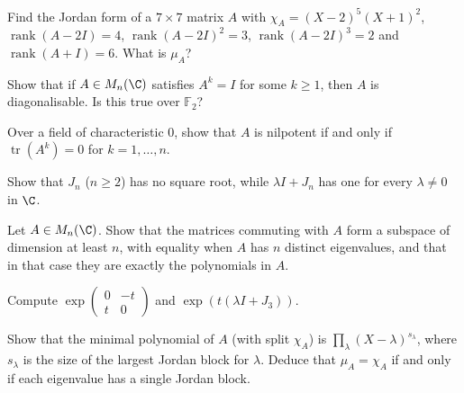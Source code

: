 \begin{exercise}[$\star\star$]\label{linear:ex:jordanfind}
Find the Jordan form of a $7\times7$ matrix $A$ with $\chi_A=(X-2)^5(X+1)^2$, $\operatorname{rank}(A-2I)=4$,
$\operatorname{rank}(A-2I)^2=3$, $\operatorname{rank}(A-2I)^3=2$ and $\operatorname{rank}(A+I)=6$. What is $\mu_A$?
\end{exercise}

\begin{exercise}[$\star\star$]\label{linear:ex:finiteorder}
Show that if $A\in M_n(\C)$ satisfies $A^k=I$ for some $k\ge1$, then $A$ is diagonalisable. Is this true over
$\mathbb F_2$?
\end{exercise}

\begin{exercise}[$\star\star$]\label{linear:ex:nilptrace}
Over a field of characteristic $0$, show that $A$ is nilpotent if and only if $\operatorname{tr}(A^k)=0$ for $k=1,\dots,n$.
\end{exercise}

\begin{exercise}[$\star\star$]\label{linear:ex:sqrt}
Show that $J_n$ ($n\ge2$) has no square root, while $\lambda I+J_n$ has one for every $\lambda\ne0$ in $\C$.
\end{exercise}

\begin{exercise}[$\star\star$]\label{linear:ex:commutant}
Let $A\in M_n(\C)$. Show that the matrices commuting with $A$ form a subspace of dimension at least $n$, with equality
when $A$ has $n$ distinct eigenvalues, and that in that case they are exactly the polynomials in $A$.
\end{exercise}

\begin{exercise}[$\star$]\label{linear:ex:rotation}
Compute $\exp\begin{pmatrix}0&-t\\t&0\end{pmatrix}$ and $\exp(t(\lambda I+J_3))$.
\end{exercise}

\begin{exercise}[$\star\star$]\label{linear:ex:minpolyjordan}
Show that the minimal polynomial of $A$ (with split $\chi_A$) is $\prod_\lambda(X-\lambda)^{s_\lambda}$, where $s_\lambda$ is the size of
the largest Jordan block for $\lambda$. Deduce that $\mu_A=\chi_A$ if and only if each eigenvalue has a single Jordan block.
\end{exercise}

